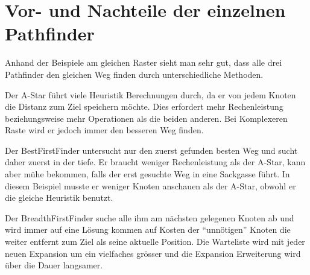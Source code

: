 \section{Vor- und Nachteile der einzelnen Pathfinder}

Anhand der Beispiele am gleichen Raster sieht man sehr gut, dass alle
drei Pathfinder den gleichen Weg finden durch unterschiedliche Methoden.

Der A-Star führt viele Heuristik Berechnungen durch, da er von jedem
Knoten die Distanz zum Ziel speichern möchte. Dies erfordert mehr
Rechenleistung beziehungsweise mehr Operationen als die beiden anderen.
Bei Komplexeren Raste wird er jedoch immer den besseren Weg finden.

Der BestFirstFinder untersucht nur den zuerst gefunden besten Weg und
sucht daher zuerst in der tiefe. Er braucht weniger Rechenleistung als
der A-Star, kann aber mühe bekommen, falls der erst gesuchte Weg in eine
Sackgasse führt. In diesem Beispiel musste er weniger Knoten anschauen
als der A-Star, obwohl er die gleiche Heuristik benutzt.

Der BreadthFirstFinder suche alle ihm am nächsten gelegenen Knoten ab
und wird immer auf eine Lösung kommen auf Kosten der ``unnötigen''
Knoten die weiter entfernt zum Ziel als seine aktuelle Position. Die
Warteliste wird mit jeder neuen Expansion um ein vielfaches grösser und
die Expansion Erweiterung wird über die Dauer langsamer.
